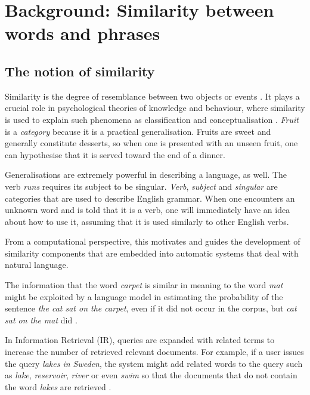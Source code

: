 \chapter{Background: Similarity between words and phrases}
\label{cha:background}

\section{The notion of similarity}
\label{sec:similarity}

Similarity is the degree of resemblance between two objects or events \cite{WCS:WCS1282}. It plays a crucial role in psychological theories of knowledge and behaviour, where similarity is used to explain such phenomena as classification and conceptualisation \cite{Tversky1977,1986-13502-00119860101,medin1993respects,Markman1996,hahn1997concepts}. \textit{Fruit} is a \emph{category} because it is a practical generalisation. Fruits are sweet and generally constitute desserts, so when one is presented with an unseen fruit, one can hypothesise that it is served toward the end of a dinner.

Generalisations are extremely powerful in describing a language, as well. The verb \textit{runs} requires its subject to be singular. \textit{Verb}, \textit{subject} and \textit{singular} are categories that are used to describe English grammar. When one encounters an unknown word and is told that it is a verb, one will immediately have an idea about how to use it, assuming that it is used similarly to other English verbs.

From a computational perspective, this motivates and guides the development of similarity components that are embedded into automatic systems that deal with natural language.

The information that the word \textit{carpet} is similar in meaning to the word \textit{mat} might be exploited by a language model in estimating the probability of the sentence \textit{the cat sat on the carpet}, even if it did not occur in the corpus, but \textit{cat sat on the mat} did \cite{bengio2006}.

In Information Retrieval (IR), queries are expanded with related terms to increase the number of retrieved relevant documents. For example, if a user issues the query \textit{lakes in Sweden}, the system might add related words to the query such as \textit{lake}, \textit{reservoir}, \textit{river} or even \textit{swim} so that the documents that do not contain the word \textit{lakes} are retrieved \cite{Xu:1996:QEU:243199.243202}.

